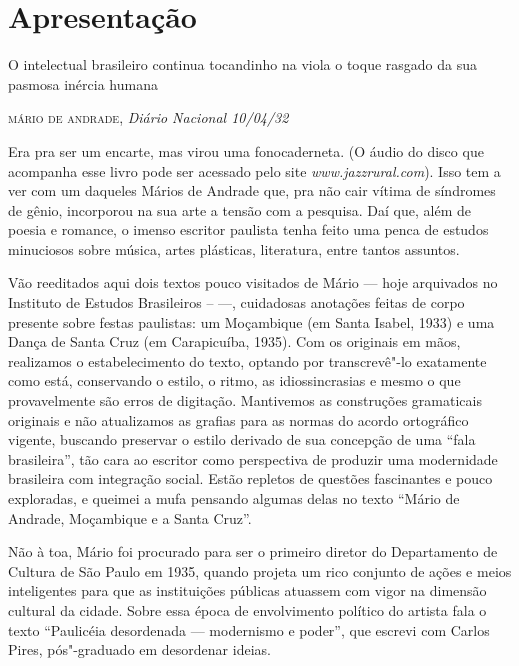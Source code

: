 \chapter*{Apresentação}

\epigraph{O intelectual brasileiro continua tocandinho na viola
o toque rasgado da sua pasmosa inércia humana}{\textsc{mário de andrade}, \emph{Diário Nacional 10/04/32}}

\noindent{}Era pra ser um encarte, mas virou uma fonocaderneta. (O áudio do 
disco que acompanha esse livro pode ser acessado pelo site 
\emph{www.jazzrural.com}). Isso tem a ver com
um daqueles Mários de Andrade que, pra não cair vítima de síndromes de
gênio, incorporou na sua arte a tensão com a pesquisa. Daí que, além de
poesia e romance, o imenso escritor paulista tenha feito uma penca de
estudos minuciosos sobre música, artes plásticas, literatura, entre
tantos assuntos.

Vão reeditados aqui dois textos pouco visitados de Mário --- hoje arquivados
no Instituto de Estudos 
Brasileiros --  ---, cuidadosas
anotações feitas de corpo presente sobre festas paulistas: um Moçambique
(em Santa Isabel, 1933) e uma Dança de Santa Cruz (em Carapicuíba,
1935). Com os originais em mãos, realizamos o estabelecimento do texto, optando por transcrevê"-lo exatamente como está, conservando o estilo, o ritmo, as idiossincrasias e mesmo o que provavelmente são erros de digitação. Mantivemos as construções gramaticais originais e não atualizamos as grafias para as normas do acordo ortográfico vigente, buscando preservar o estilo derivado de sua concepção de uma ``fala brasileira'', tão cara ao escritor como perspectiva de produzir uma modernidade brasileira com integração social. Estão repletos de questões fascinantes e pouco exploradas, e
queimei a mufa pensando algumas delas no texto ``Mário de Andrade, Moçambique
e a Santa Cruz''.

Não à toa, Mário foi procurado para ser o primeiro diretor do
Departamento de Cultura de São Paulo em 1935, quando projeta um rico conjunto de
ações e meios inteligentes para que as instituições públicas atuassem
com vigor na dimensão cultural da cidade. Sobre essa época de
envolvimento político do artista fala o texto ``Paulicéia desordenada ---
modernismo e poder'', que escrevi com Carlos Pires, pós"-graduado em
desordenar ideias.

